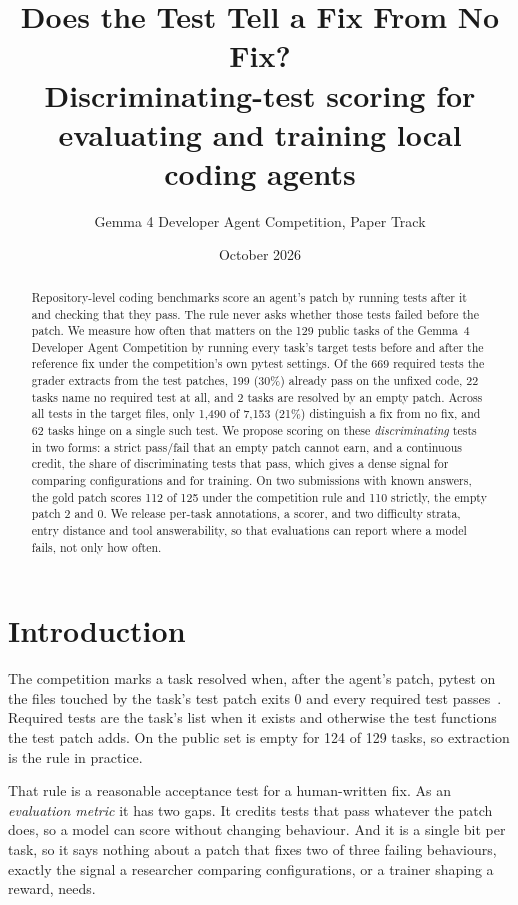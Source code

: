 \documentclass[10pt,a4paper]{article}
\title{\textbf{Does the Test Tell a Fix From No Fix?}\\[4pt]
\large Discriminating-test scoring for evaluating and training local coding agents}
\author{Gemma 4 Developer Agent Competition, Paper Track}
\date{October 2026}
\newcommand{\code}[1]{\path{#1}}
\begin{document}
\maketitle

\begin{abstract}
Repository-level coding benchmarks score an agent's patch by running tests after it and checking that they pass. The rule never asks whether those tests failed before the patch. We measure how often that matters on the 129 public tasks of the Gemma~4 Developer Agent Competition by running every task's target tests before and after the reference fix under the competition's own pytest settings. Of the 669 required tests the grader extracts from the test patches, 199 (30\%) already pass on the unfixed code, 22 tasks name no required test at all, and 2 tasks are resolved by an empty patch. Across all tests in the target files, only 1,490 of 7,153 (21\%) distinguish a fix from no fix, and 62 tasks hinge on a single such test. We propose scoring on these \emph{discriminating} tests in two forms: a strict pass/fail that an empty patch cannot earn, and a continuous credit, the share of discriminating tests that pass, which gives a dense signal for comparing configurations and for training. On two submissions with known answers, the gold patch scores 112 of 125 under the competition rule and 110 strictly, the empty patch 2 and 0. We release per-task annotations, a scorer, and two difficulty strata, entry distance and tool answerability, so that evaluations can report where a model fails, not only how often.
\end{abstract}

\section{Introduction}

The competition marks a task resolved when, after the agent's patch, pytest on the files touched by the task's test patch exits 0 and every required test passes~\cite{harness}. Required tests are the task's \code{FAIL_TO_PASS} list when it exists and otherwise the test functions the test patch adds. On the public set \code{FAIL_TO_PASS} is empty for 124 of 129 tasks, so extraction is the rule in practice.

That rule is a reasonable acceptance test for a human-written fix. As an \emph{evaluation metric} it has two gaps. It credits tests that pass whatever the patch does, so a model can score without changing behaviour. And it is a single bit per task, so it says nothing about a patch that fixes two of three failing behaviours, exactly the signal a researcher comparing configurations, or a trainer shaping a reward, needs.
\end{document}
